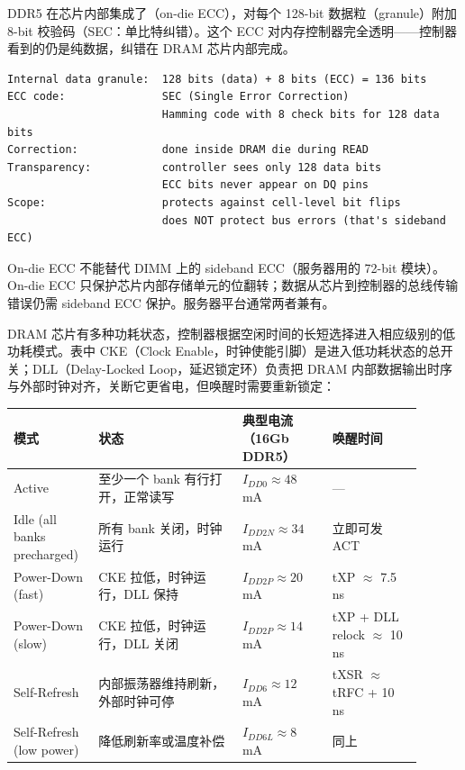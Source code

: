
DDR5 在芯片内部集成了（on-die ECC），对每个 128-bit 数据粒（granule）附加 8-bit 校验码（SEC：单比特纠错）。这个 ECC 对内存控制器完全透明——控制器看到的仍是纯数据，纠错在 DRAM 芯片内部完成。

\begin{lstlisting}[numbers=none,caption={DDR5 on-die ECC 结构}]
Internal data granule:  128 bits (data) + 8 bits (ECC) = 136 bits
ECC code:               SEC (Single Error Correction)
                        Hamming code with 8 check bits for 128 data bits
Correction:             done inside DRAM die during READ
Transparency:           controller sees only 128 data bits
                        ECC bits never appear on DQ pins
Scope:                  protects against cell-level bit flips
                        does NOT protect bus errors (that's sideband ECC)
\end{lstlisting}

\begin{warningbox}
On-die ECC 不能替代 DIMM 上的 sideband ECC（服务器用的 72-bit 模块）。On-die ECC 只保护芯片内部存储单元的位翻转；数据从芯片到控制器的总线传输错误仍需 sideband ECC 保护。服务器平台通常两者兼有。
\end{warningbox}


DRAM 芯片有多种功耗状态，控制器根据空闲时间的长短选择进入相应级别的低功耗模式。表中 CKE（Clock Enable，时钟使能引脚）是进入低功耗状态的总开关；DLL（Delay-Locked Loop，延迟锁定环）负责把 DRAM 内部数据输出时序与外部时钟对齐，关断它更省电，但唤醒时需要重新锁定：

\begin{longtable}{L{0.18\linewidth}L{0.32\linewidth}L{0.2\linewidth}L{0.2\linewidth}}
\toprule
模式 & 状态 & 典型电流（16Gb DDR5） & 唤醒时间 \\
\midrule
Active & 至少一个 bank 有行打开，正常读写 & $I_{DD0} \approx 48$ mA & --- \\
Idle (all banks precharged) & 所有 bank 关闭，时钟运行 & $I_{DD2N} \approx 34$ mA & 立即可发 ACT \\
Power-Down (fast) & CKE 拉低，时钟运行，DLL 保持 & $I_{DD2P} \approx 20$ mA & tXP $\approx$ 7.5 ns \\
Power-Down (slow) & CKE 拉低，时钟运行，DLL 关闭 & $I_{DD2P} \approx 14$ mA & tXP + DLL relock $\approx$ 10 ns \\
Self-Refresh & 内部振荡器维持刷新，外部时钟可停 & $I_{DD6} \approx 12$ mA & tXSR $\approx$ tRFC + 10 ns \\
Self-Refresh (low power) & 降低刷新率或温度补偿 & $I_{DD6L} \approx 8$ mA & 同上 \\
\bottomrule
\end{longtable}

